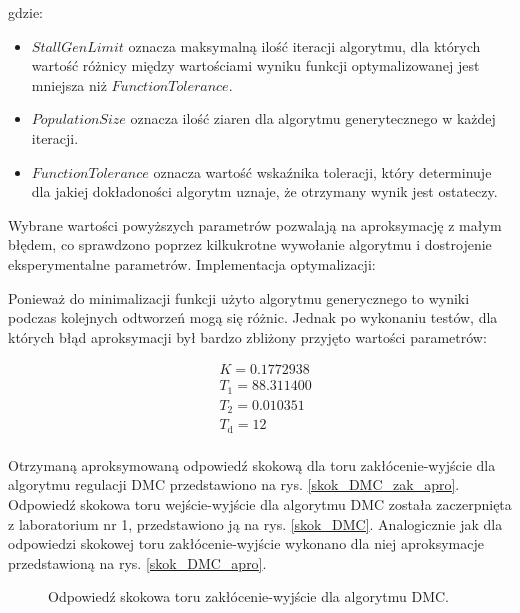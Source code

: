 \documentclass[a4paper,titlepage,11pt,twosides,floatssmall]{mwrep}
\begin{document}
gdzie:

\begin{itemize}
	\item $StallGenLimit$ oznacza maksymalną ilość iteracji algorytmu, dla których wartość różnicy między wartościami wyniku funkcji optymalizowanej jest mniejsza niż $FunctionTolerance$.
	\item $PopulationSize$ oznacza ilość ziaren dla algorytmu generytecznego w każdej iteracji.
	\item $FunctionTolerance$ oznacza wartość wskaźnika toleracji, który determinuje dla jakiej dokładoności algorytm uznaje, że otrzymany wynik jest ostateczy.
\end{itemize}

Wybrane wartości powyższych parametrów pozwalają na aproksymację z małym błędem, co sprawdzono poprzez kilkukrotne wywołanie algorytmu i dostrojenie eksperymentalne parametrów. Implementacja optymalizacji:



Ponieważ do  minimalizacji funkcji użyto algorytmu generycznego to wyniki podczas kolejnych odtworzeń mogą się różnic. Jednak po wykonaniu testów, dla których błąd aproksymacji był bardzo zbliżony przyjęto wartości parametrów:

\begin{equation}
	\begin{split}
		& K = 0.1772938\\
		& T_1 = 88.311400 \\
		& T_2 = 0.010351 \\
		& T_{\mathrm{d}} = 12 \\
	\end{split}
\end{equation}

Otrzymaną aproksymowaną odpowiedź skokową dla toru zakłócenie-wyjście dla algorytmu regulacji DMC przedstawiono na rys. \ref{skok_DMC_zak_apro}. Odpowiedź skokowa toru wejście-wyjście dla algorytmu DMC została zaczerpnięta z laboratorium nr 1, przedstawiono ją na rys. \ref{skok_DMC}. Analogicznie jak dla odpowiedzi skokowej toru zakłócenie-wyjście wykonano dla niej aproksymacje przedstawioną na rys. \ref{skok_DMC_apro}.


\begin{figure}[H]
	\centering
	
	\caption{Odpowiedź skokowa toru zakłócenie-wyjście dla algorytmu DMC.}
	\label{skok_DMC_zak}
\end{figure}
	
\end{document}

